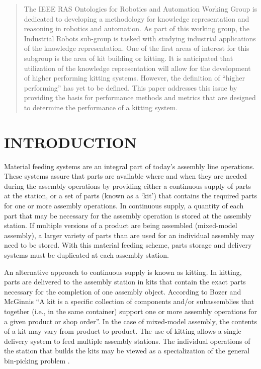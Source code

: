 



%
\maketitle
\thispagestyle{empty}
\pagestyle{plain}

\begin{abstract}

The IEEE RAS Ontologies for Robotics and Automation Working Group is dedicated to
developing a methodology for knowledge representation and reasoning in robotics
and automation. As part of this working group, the Industrial Robots sub-group is
tasked with studying industrial applications of the knowledge representation. One of the first
areas of interest for this subgroup is the area of kit building or kitting.
It is anticipated that utilization of the knowledge representation will allow for the development
of higher performing kitting systems. However, the definition of ``higher performing''
has yet to be defined. This paper addresses this issue by providing the basis
for performance methods and metrics that are designed to
determine the performance of a kitting system.
\end{abstract}


\section{INTRODUCTION}
Material feeding systems are an integral part of today's assembly line operations.
These systems assure that parts are available where and when
they are needed during the assembly operations by providing either a continuous
supply of parts at the station, or a set of parts (known
as a `kit') that contains the required parts for one or more assembly operations.
In continuous supply, a quantity of each part that
may be necessary for the assembly operation is stored at the assembly station.
If multiple versions of a product are being assembled (mixed-model assembly),
a larger variety of parts than are used for an individual assembly may need
to be stored. With this material feeding scheme, parts
storage and delivery systems must be duplicated at each assembly station.

An alternative approach to continuous supply is known as kitting. In kitting,
parts are delivered to the assembly station in kits that contain
the exact parts necessary for the completion of one assembly object.
According to Bozer and McGinnis \cite{Bozer1992} ``A kit is a specific
collection of components and/or subassemblies that together
(i.e., in the same container) support one or more assembly
operations for a given product or shop order''. In the case of mixed-model
assembly, the contents of a kit may vary from product to product.
The use of kitting allows a single delivery system to feed
multiple assembly stations. The individual operations of the station that
builds the kits may be viewed as a specialization of the general 
bin-picking problem \cite{Schyja2012}.

